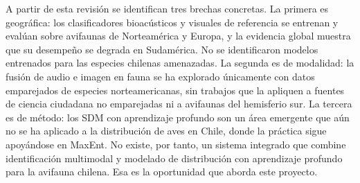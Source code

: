 A partir de esta revisión se identifican tres brechas concretas. La primera
es geográfica: los clasificadores bioacústicos y visuales de referencia se
entrenan y evalúan sobre avifaunas de Norteamérica y Europa, y la evidencia
global muestra que su desempeño se degrada en Sudamérica. No se identificaron
modelos entrenados para las especies chilenas amenazadas. La segunda es de
modalidad: la fusión de audio e imagen en fauna se ha explorado únicamente
con datos emparejados de especies norteamericanas, sin trabajos que la
apliquen a fuentes de ciencia ciudadana no emparejadas ni a avifaunas del
hemisferio sur. La tercera es de método: los SDM con aprendizaje profundo son
un área emergente que aún no se ha aplicado a la distribución de aves en
Chile, donde la práctica sigue apoyándose en MaxEnt. No existe, por tanto, un
sistema integrado que combine identificación multimodal y modelado de
distribución con aprendizaje profundo para la avifauna chilena. Esa es la
oportunidad que aborda este proyecto.
